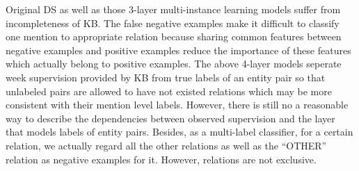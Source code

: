 \documentclass[10pt]{article} %
\theoremstyle{definition}
\theoremstyle{definition}
\begin{document}
Original DS as well as those 3-layer multi-instance learning models suffer from incompleteness of KB. 
The false negative examples make it difficult to classify one mention to appropriate relation 
because sharing common features between negative examples and positive examples reduce the importance of these features which actually belong to positive examples. 
The above 4-layer models seperate week supervision provided by KB from true labels of an entity pair 
so that unlabeled pairs are allowed to have not existed relations which may be more consistent with their mention level labels. 
However, there is still no a reasonable way to describe the dependencies between observed supervision and the layer that models labels of entity pairs. 
Besides, as a multi-label classifier, for a certain relation, we actually regard all the other relations as well as the ``OTHER'' relation as negative examples for it. 
However, relations are not exclusive. 


\end{document}
